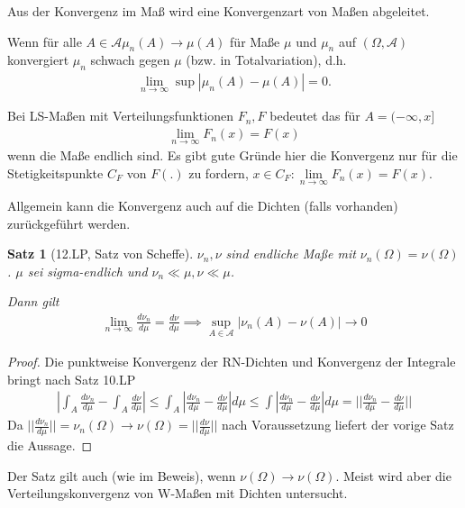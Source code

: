 \documentclass[]{article}
\newtheorem{theorem}{Satz}
\begin{document}
Aus der Konvergenz im Maß wird eine Konvergenzart von Maßen abgeleitet.

Wenn für alle $A \in \mathcal{A} \mu_n(A) \rightarrow \mu(A)$ für Maße $\mu$ und $\mu_n$ auf $(\Omega, \mathcal{A})$ konvergiert $\mu_n$ schwach gegen $\mu$ (bzw. in Totalvariation), d.h.
\begin{align*}
	\lim\limits_{n\rightarrow\infty} \sup |\mu_n(A) - \mu(A)| = 0.
\end{align*}

Bei LS-Maßen mit Verteilungsfunktionen $F_n,F$ bedeutet das für $A=(-\infty, x]$
\begin{align*}
	\lim\limits_{n\rightarrow\infty}F_n(x) = F(x)
\end{align*}
wenn die Maße endlich sind. Es gibt gute Gründe hier die Konvergenz nur für die Stetigkeitspunkte $C_F$ von $F(.)$ zu fordern, $x \in C_F : \lim\limits_{n\rightarrow\infty}F_n(x)=F(x)$.

Allgemein kann die Konvergenz auch auf die Dichten (falls vorhanden) zurückgeführt werden.

\begin{theorem}[12.LP, Satz von Scheffe]
	$\nu_n, \nu$ sind endliche Maße mit $\nu_n(\Omega) = \nu(\Omega)$. $\mu$ sei sigma-endlich und $\nu_n \ll \mu, \nu \ll \mu$.
	
	Dann gilt
	\begin{align*}
		\lim\limits_{n\rightarrow\infty} \frac{d\nu_n}{d\mu} = \frac{d\nu}{d\mu} \implies \sup_{A\in \mathcal{A}} |\nu_n(A)-\nu(A)| \rightarrow 0
	\end{align*}
\end{theorem}

\begin{proof}
	Die punktweise Konvergenz der RN-Dichten und Konvergenz der Integrale bringt nach Satz 10.LP
	\begin{align*}
		\left|\int_A \frac{d\nu_n}{d\mu} - \int_A \frac{d\nu}{d\mu}\right| \leq \int_A \left|\frac{d\nu_n}{d\mu} - \frac{d\nu}{d\mu}\right| d\mu \leq \int \left|\frac{d\nu_n}{d\mu} - \frac{d\nu}{d\mu}\right| d\mu = ||\frac{d\nu_n}{d\mu} - \frac{d\nu}{d\mu}||
	\end{align*}
	Da $||\frac{d\nu_n}{d\mu}|| = \nu_n(\Omega) \rightarrow \nu(\Omega) = ||\frac{d\nu}{d\mu}||$ nach Voraussetzung liefert der vorige Satz die Aussage.
\end{proof}

Der Satz gilt auch (wie im Beweis), wenn $\nu(\Omega)\rightarrow\nu(\Omega)$. Meist wird aber die Verteilungskonvergenz von W-Maßen mit Dichten untersucht.
\end{document}
